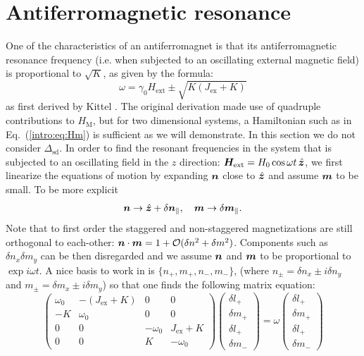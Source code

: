 \section{Antiferromagnetic resonance}
One of the characteristics of an antiferromagnet is that its antiferromagnetic resonance frequency (i.e. when subjected to an oscillating external magnetic field) is proportional to $\sqrt{K}$, as given by the formula:
\begin{equation}
    \omega = \gamma_0 H_\text{ext} \pm \sqrt{K(J_\text{ex}+K)}
\end{equation}
as first derived by Kittel \cite{PhysRev.82.565, PhysRev.85.329}. The original derivation made use of quadruple contributions to $H_\text{M}$, but for two dimensional systems, a Hamiltonian such as in Eq.~(\ref{intro:eq:Hm}) is sufficient as we will demonstrate. In this section we do not consider $\Delta_\text{sd}$. In order to find the resonant frequencies in the system that is subjected to an oscillating field in the $z$ direction: $\boldsymbol{H}_\text{ext} = H_0 \cos \omega t\,\hat{\boldsymbol{z}}$, we first linearize the equations of motion by expanding $\boldsymbol{n}$ close to $\hat{\boldsymbol{z}}$ and assume $\boldsymbol{m}$ to be small. To be more explicit
\begin{equation}
	\boldsymbol{n} \rightarrow \hat{\boldsymbol{z}} + \delta \boldsymbol{n}_\parallel,\quad \boldsymbol{m} \rightarrow \delta \boldsymbol{m}_\parallel.
\end{equation}
Note that to first order the staggered and non-staggered magnetizations are still orthogonal to each-other: $\boldsymbol{n}\cdot\boldsymbol{m}=1+\mathcal{O}(\delta n^2+\delta m^2)$. Components such as $\delta n_x \delta m_y$ can be then disregarded and we assume $\boldsymbol{n}$ and $\boldsymbol{m}$ to be proportional to $\exp i \omega t$. A nice basis to work in is $\{{n}_+,{m}_+,{n}_-,{m}_- \}$, (where ${n}_\pm = \delta n_x\pm i \delta n_y$ and ${m}_\pm = \delta m_x\pm i \delta m_y$) so that one finds the following matrix equation:
\begin{equation}
    \begin{pmatrix}
    \omega_0  &  -(J_\text{ex}+K)  &  0  &  0 \\
    -K  &  \omega_0  &  0  &  0 \\
    0  &  0  &  -\omega_0  &  J_\text{ex}+K \\
    0  &  0  &  K  &  -\omega_0
    \end{pmatrix}
    \begin{pmatrix}
    \delta l_{+}\\
    \delta m_{+}\\
    \delta l_{+}\\
    \delta m_{-}
    \end{pmatrix}
    =\omega 
    \begin{pmatrix}
    \delta l_{+}\\
    \delta m_{+}\\
    \delta l_{+}\\
    \delta m_{-}
    \end{pmatrix}
\end{equation}
